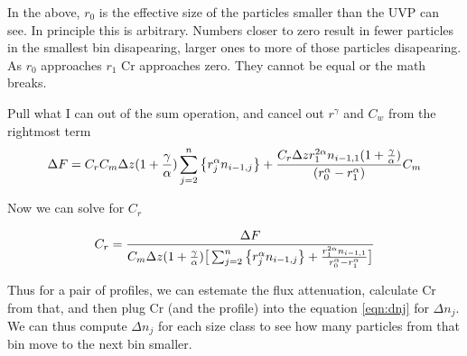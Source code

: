\documentclass[a4paper,12pt]{article}
\begin{document}
In the above, $r_0$ is the effective size of the particles smaller than the UVP can see. In principle this is arbitrary. Numbers closer to zero result in fewer particles in the smallest bin disapearing, larger ones to more of those particles disapearing. As $r_0$ approaches $r_1$ Cr approaches zero. They cannot be equal or the math breaks.

Pull what I can out of the sum operation, and cancel out $r^{\gamma}$ and $C_w$ from the rightmost term
\begin{equation}
\Delta F =
C_r C_m \Delta z (1 + {\gamma \over \alpha}) \sum_{j = 2}^n \left\{r_j^\alpha n_{i-1,j} \right\}
+
 {{{C_r} \Delta z r_1^{2 \alpha} n_{i-1,1}(1 + {\gamma \over \alpha})} \over {(r_{0}^\alpha - r_1^\alpha})}
C_m 
\end{equation}

Now we can solve for $C_r$

\begin{equation}
C_r = {
\Delta F \over 
C_m \Delta z 
(1 + {\gamma \over \alpha}) \big[ \sum_{j = 2}^n  \big\{
r_j^\alpha n_{i-1,j}
\big\} +
{{r_1^{2\alpha}n_{i-1,1}}\over{r_0^\alpha - r_1^\alpha}}
\big]
}
\end{equation}

Thus for a pair of profiles, we can estemate the flux attenuation, calculate Cr from that, and then plug Cr (and the profile) into the equation \ref{eqn:dnj} for $\Delta n_j$. We can thus compute $\Delta n_j$ for each size class to see how many particles from that bin move to the next bin smaller.



 
\end{document}
